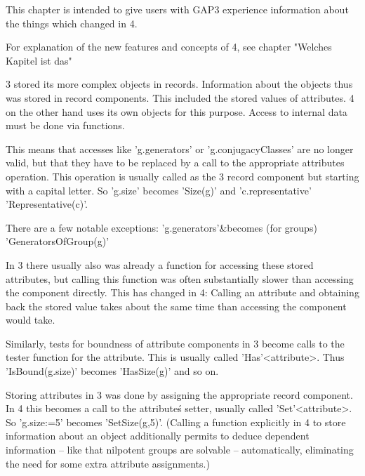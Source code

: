

This chapter is intended to give users with {\sf GAP}3 experience
information about the things which changed in {\GAP}4.

For explanation of the new features and concepts of {\GAP}4, see chapter
"Welches Kapitel ist das"


{\GAP}3 stored its more complex objects in records. Information about the
objects thus was stored in record components. This included the stored
values of attributes. {\GAP}4 on the other hand uses its own objects for
this purpose. Access to internal data must be done via functions.

This means that accesses like 'g.generators' or 'g.conjugacyClasses' are no
longer valid, but that they have to be replaced by a call to the
appropriate attributes operation. This operation is usually called 
as the {\GAP}3 record component but starting with a capital letter. 
So 'g.size' becomes 'Size(g)' and 'c.representative' 'Representative(c)'.

There are a few notable exceptions:
\beginitems
'g.generators'&becomes (for groups) 'GeneratorsOfGroup(g)'

\enditems

In {\GAP}3 there usually also was already a function for accessing these
stored attributes, but calling this function was often substantially slower
than accessing the component directly. This has changed in {\GAP}4: Calling
an attribute and obtaining back the stored value takes about the same time
than accessing the component would take.

Similarly, tests for boundness of attribute components in {\GAP}3 become
calls to the tester function for the attribute. This is usually called
'Has'<attribute>. Thus 'IsBound(g.size)' becomes 'HasSize(g)' and so on.

Storing attributes in {\GAP}3 was done by assigning the appropriate record
component. In {\GAP}4 this becomes a call to the attribute\'s setter, usually
called 'Set'<attribute>. So 'g.size:=5' becomes 'SetSize(g,5)'.
(Calling a function explicitly in {\GAP}4 to store information about an 
object additionally permits {\GAP} to deduce dependent information -- like
that nilpotent groups are solvable -- automatically, eliminating the need
for some extra attribute assignments.)

